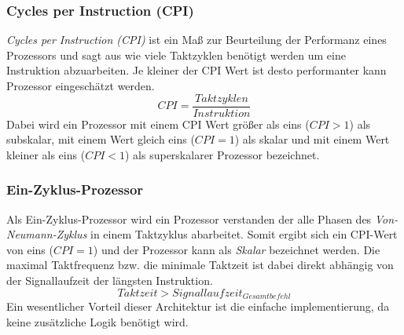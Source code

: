             \subsubsection{Cycles per Instruction (CPI)}
                \textit{Cycles per Instruction (CPI)} ist ein Maß zur Beurteilung der Performanz eines Prozessors
                und sagt aus wie viele Taktzyklen benötigt werden um eine Instruktion abzuarbeiten.
                Je kleiner der CPI Wert ist desto performanter kann Prozessor eingeschätzt werden.
                \begin{equation}
                    CPI = \frac{Taktzyklen}{Instruktion}
                \end{equation}
                Dabei wird ein Prozessor mit einem CPI Wert größer als eins ($CPI > 1$) als subskalar,
                mit einem Wert gleich eins ($CPI = 1$) als skalar und mit einem Wert kleiner als eins
                ($CPI < 1$) als superskalarer Prozessor bezeichnet.
   

            \subsubsection{Ein-Zyklus-Prozessor}
                Als Ein-Zyklus-Prozessor wird ein Prozessor verstanden der alle Phasen des \textit{Von-Neumann-Zyklus}
                in einem Taktzyklus abarbeitet.
                Somit ergibt sich ein CPI-Wert von eins ($CPI = 1$) und der Prozessor kann als \textit{Skalar} bezeichnet werden.
                Die maximal Taktfrequenz bzw. die minimale Taktzeit ist dabei direkt abhängig von der Signallaufzeit
                der längsten Instruktion.
                \begin{equation}
                    Taktzeit > Signallaufzeit_{Gesamtbefehl}
                \end{equation}
                Ein wesentlicher Vorteil dieser Architektur ist die einfache implementierung, da
                keine zusätzliche Logik benötigt wird.


